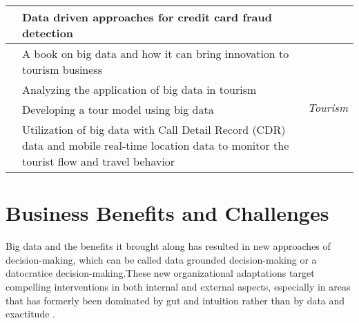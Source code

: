\begin{center}
\begin{longtable}{|p{4cm}|p{8cm}|p{1cm}|}
        \cite{Tran2018}            & Data driven approaches for credit card fraud detection                                                                                        &                                             \\

        \hline
        \cite{Sigala2019}          & A book on big data and how it can bring innovation to tourism business                                                                        & \multirow{5}{*}{\begin{turn}{-90} \textit{Tourism} \end{turn}}  \\

        \cite{Zhang2019a}          & Analyzing the application of big data in tourism                                                                                              &                                             \\

        \cite{Dezfouli2018}        & Developing a tour model using big data                                                                                                        &                                             \\

        \cite{Qin2019}             & Utilization of big data with Call Detail Record (CDR) data and mobile real-time location data to monitor the tourist flow and travel behavior &                                             \\

        \hline
    \end{longtable}
\end{center}


\section{Business Benefits and Challenges}

Big data and the  benefits it brought along has resulted in new approaches of decision-making, which can be called data grounded decision-making \cite{Comuzzi2016} or a datocratice decision-making.These new organizational adaptations target compelling interventions in both internal and external aspects, especially in areas that has formerly been dominated by gut and intuition rather than by data and exactitude \cite{Wamba2017}.

